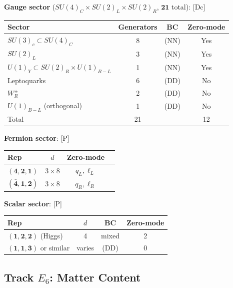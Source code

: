 \documentclass[11pt,a4paper]{article}
\newcommand{\tagDc}{\textcolor{blue!50!black}{[Dc]}}
\newcommand{\tagP}{\textcolor{green!50!black}{[P]}}
\begin{document}
\begin{trackbox}
\textbf{Gauge sector} ($SU(4)_C \times SU(2)_L \times SU(2)_R$, $\mathbf{21}$ total): \tagDc
\begin{center}
\begin{tabular}{lccc}
\toprule
Sector & Generators & BC & Zero-mode \\
\midrule
$SU(3)_c \subset SU(4)_C$ & 8 & (NN) & Yes \\
$SU(2)_L$ & 3 & (NN) & Yes \\
$U(1)_Y \subset SU(2)_R \times U(1)_{B-L}$ & 1 & (NN) & Yes \\
Leptoquarks & 6 & (DD) & No \\
$W_R^\pm$ & 2 & (DD) & No \\
$U(1)_{B-L}$ (orthogonal) & 1 & (DD) & No \\
\midrule
Total & 21 & & 12 \\
\bottomrule
\end{tabular}
\end{center}

\textbf{Fermion sector}: \tagP
\begin{center}
\begin{tabular}{lccc}
\toprule
Rep & $d$ & Zero-mode \\
\midrule
$(\mathbf{4}, \mathbf{2}, \mathbf{1})$ & $3 \times 8$ & $q_L, \ell_L$ \\
$(\bar{\mathbf{4}}, \mathbf{1}, \mathbf{2})$ & $3 \times 8$ & $q_R, \ell_R$ \\
\bottomrule
\end{tabular}
\end{center}

\textbf{Scalar sector}: \tagP
\begin{center}
\begin{tabular}{lccc}
\toprule
Rep & $d$ & BC & Zero-mode \\
\midrule
$(\mathbf{1}, \mathbf{2}, \mathbf{2})$ (Higgs) & 4 & mixed & 2 \\
$(\mathbf{1}, \mathbf{1}, \mathbf{3})$ or similar & varies & (DD) & 0 \\
\bottomrule
\end{tabular}
\end{center}

\end{trackbox}

\subsection{Track $E_6$: Matter Content}
\end{document}
